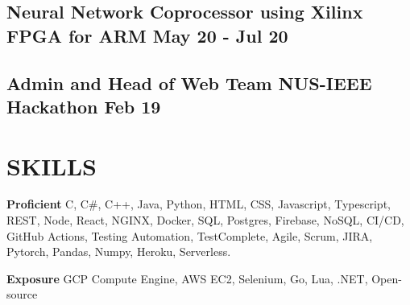 \documentclass[11pts]{article}
\begin{document}
\subsection*{Neural Network Coprocessor using Xilinx FPGA for ARM \hfill May 20 - Jul 20}

\subsection*{Admin and Head of Web Team NUS-IEEE Hackathon \href{https://www.nusieeehackathon.com/}{\faGlobe} \hfill Feb 19}

\section*{SKILLS}

{\large \bf Proficient}
C, C\#, C++, Java, Python, HTML, CSS, Javascript, Typescript, REST, Node, React, NGINX, Docker,
SQL, Postgres, Firebase, NoSQL, CI/CD, GitHub Actions, Testing Automation, TestComplete, Agile, Scrum, JIRA,
Pytorch, Pandas, Numpy, Heroku, Serverless.

{\large \bf Exposure}
GCP Compute Engine, AWS EC2, Selenium, Go, Lua, .NET, Open-source
\end{document}
